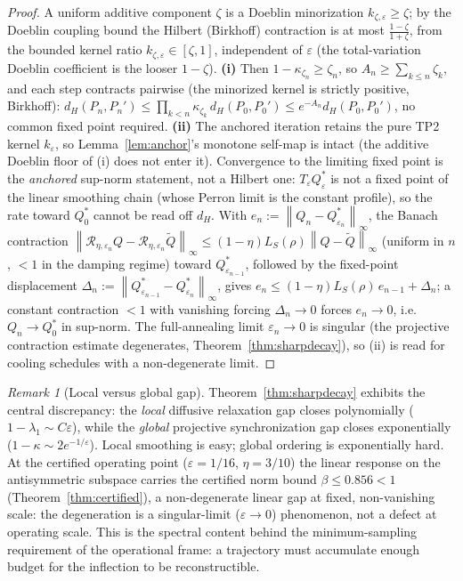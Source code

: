 \documentclass[11pt]{article}
\theoremstyle{plain}
\theoremstyle{definition}
\theoremstyle{remark}
\newtheorem{remark}[theorem]{Remark}
\newcommand{\norm}[1]{\left\lVert#1\right\rVert}
\newcommand{\Rc}{\mathcal R}
\begin{document}
\begin{proof}
A uniform additive component $\zeta$ is a Doeblin minorization $k_{\zeta,\varepsilon}\ge\zeta$; by the Doeblin coupling bound \citep{doeblin1937,seneta2006} the Hilbert (Birkhoff) contraction is at most $\frac{1-\zeta}{1+\zeta}$, from the bounded kernel ratio $k_{\zeta,\varepsilon}\in[\zeta,1]$, independent of $\varepsilon$ (the total-variation Doeblin coefficient is the looser $1-\zeta$). \textbf{(i)} Then $1-\kappa_{\zeta_n}\ge\zeta_n$, so $A_n\ge\sum_{k\le n}\zeta_k$, and each step contracts pairwise (the minorized kernel is strictly positive, Birkhoff): $d_H(P_n,P_n')\le\prod_{k<n}\kappa_{\zeta_k}\,d_H(P_0,P_0')\le e^{-A_n}d_H(P_0,P_0')$, no common fixed point required. \textbf{(ii)} The anchored iteration retains the pure TP2 kernel $k_\varepsilon$, so Lemma~\ref{lem:anchor}'s monotone self-map is intact (the additive Doeblin floor of (i) does not enter it). Convergence to the limiting fixed point is the \emph{anchored} sup-norm statement, not a Hilbert one: $T_\varepsilon Q^*_\varepsilon$ is not a fixed point of the linear smoothing chain (whose Perron limit is the constant profile), so the rate toward $Q^*_0$ cannot be read off $d_H$. With $e_n:=\norm{Q_n-Q^*_{\varepsilon_n}}_\infty$, the Banach contraction $\norm{\Rc_{\eta,\varepsilon_n}Q-\Rc_{\eta,\varepsilon_n}\widetilde Q}_\infty\le(1-\eta)L_S(\rho)\norm{Q-\widetilde Q}_\infty$ (uniform in $n$, $<1$ in the damping regime) toward $Q^*_{\varepsilon_{n-1}}$, followed by the fixed-point displacement $\Delta_n:=\norm{Q^*_{\varepsilon_{n-1}}-Q^*_{\varepsilon_n}}_\infty$, gives $e_n\le(1-\eta)L_S(\rho)\,e_{n-1}+\Delta_n$; a constant contraction $<1$ with vanishing forcing $\Delta_n\to0$ forces $e_n\to0$, i.e.\ $Q_n\to Q^*_0$ in sup-norm. The full-annealing limit $\varepsilon_n\to0$ is singular (the projective contraction estimate degenerates, Theorem~\ref{thm:sharpdecay}), so (ii) is read for cooling schedules with a non-degenerate limit.
\end{proof}

\begin{remark}[Local versus global gap]
Theorem~\ref{thm:sharpdecay} exhibits the central discrepancy: the \emph{local} diffusive relaxation gap closes polynomially ($1-\lambda_1\sim C\varepsilon$), while the \emph{global} projective synchronization gap closes exponentially ($1-\kappa\sim2e^{-1/\varepsilon}$). Local smoothing is easy; global ordering is exponentially hard. At the certified operating point ($\varepsilon=1/16$, $\eta=3/10$) the linear response on the antisymmetric subspace carries the certified norm bound $\beta\le0.856<1$ (Theorem~\ref{thm:certified}), a non-degenerate linear gap at fixed, non-vanishing scale: the degeneration is a singular-limit ($\varepsilon\to0$) phenomenon, not a defect at operating scale. This is the spectral content behind the minimum-sampling requirement of the operational frame: a trajectory must accumulate enough budget for the inflection to be reconstructible.
\end{remark}
\end{document}
